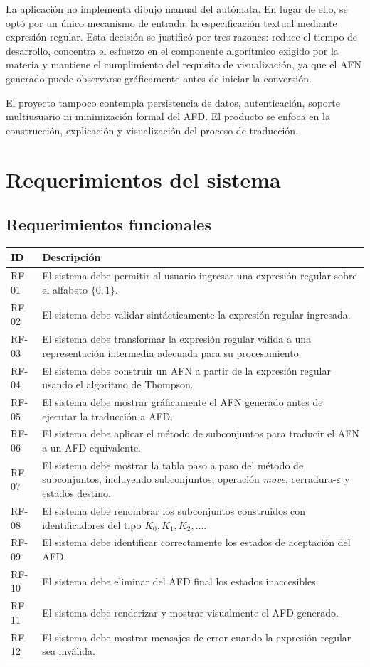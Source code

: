 \documentclass[12pt]{article}
\begin{document}
La aplicación no implementa dibujo manual del autómata. En lugar de ello, se optó por un único mecanismo de entrada: la especificación textual mediante expresión regular. Esta decisión se justificó por tres razones: reduce el tiempo de desarrollo, concentra el esfuerzo en el componente algorítmico exigido por la materia y mantiene el cumplimiento del requisito de visualización, ya que el AFN generado puede observarse gráficamente antes de iniciar la conversión.

El proyecto tampoco contempla persistencia de datos, autenticación, soporte multiusuario ni minimización formal del AFD. El producto se enfoca en la construcción, explicación y visualización del proceso de traducción.

\section{Requerimientos del sistema}

\subsection{Requerimientos funcionales}

\begin{longtable}{p{1.5cm} p{11.8cm}}
\toprule
\textbf{ID} & \textbf{Descripción} \\
\midrule
RF-01 & El sistema debe permitir al usuario ingresar una expresión regular sobre el alfabeto $\{0,1\}$. \\
RF-02 & El sistema debe validar sintácticamente la expresión regular ingresada. \\
RF-03 & El sistema debe transformar la expresión regular válida a una representación intermedia adecuada para su procesamiento. \\
RF-04 & El sistema debe construir un AFN a partir de la expresión regular usando el algoritmo de Thompson. \\
RF-05 & El sistema debe mostrar gráficamente el AFN generado antes de ejecutar la traducción a AFD. \\
RF-06 & El sistema debe aplicar el método de subconjuntos para traducir el AFN a un AFD equivalente. \\
RF-07 & El sistema debe mostrar la tabla paso a paso del método de subconjuntos, incluyendo subconjuntos, operación \textit{move}, cerradura-$\varepsilon$ y estados destino. \\
RF-08 & El sistema debe renombrar los subconjuntos construidos con identificadores del tipo $K_0, K_1, K_2, \dots$. \\
RF-09 & El sistema debe identificar correctamente los estados de aceptación del AFD. \\
RF-10 & El sistema debe eliminar del AFD final los estados inaccesibles. \\
RF-11 & El sistema debe renderizar y mostrar visualmente el AFD generado. \\
RF-12 & El sistema debe mostrar mensajes de error cuando la expresión regular sea inválida. \\
\bottomrule
\end{longtable}
\end{document}
